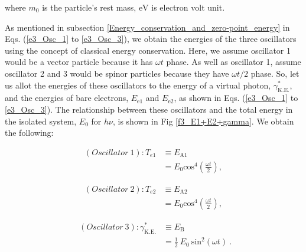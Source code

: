 \documentclass[%
 reprint,
 amsmath,amssymb,
 aps,
]{revtex4-1}
\numberwithin{equation}{section}
\begin{document}
    \noindent
    where $m_{0}$ is the particle's rest mass, $\mathrm{eV}$ is electron volt unit.

    As mentioned in subsection \ref{Energy_conservation_and_zero-point_energy} in Eqs. (\ref{e3_Osc_1} to \ref{e3_Osc_3}), we obtain the energies of the three oscillators using the concept of classical energy conservation. Here, we assume oscillator 1 would be a vector particle because it has $\omega t$ phase. As well as oscillator 1, assume oscillator 2 and 3 would be spinor particles because they have $\omega t / 2$ phase. So, let us allot the energies of these oscillators to the energy of a virtual photon, $\gamma^{*}_\mathrm{K.E.}$, and the energies of bare electrons, $E_\mathrm{e1}$ and $E_\mathrm{e2}$, as shown in Eqs. (\ref{e3_Osc_1} to \ref{e3_Osc_3}). The relationship between these oscillators and the total energy in the isolated system, $E_\mathrm{0}$ for $h \nu$, is shown in Fig \ref{f3_E1+E2+gamma}. We obtain the following:

        \begin{equation}
            \begin{split}
                (Oscillator \ 1): T_{e1}
                    & \equiv E_{\mathrm{A1}} \\
                    &= E_{0} \mathrm{cos}^{4} \left( \frac{\omega t}{2} \right)
                    ,
                \label{e3_Osc_1_PE}
            \end{split}
        \end{equation}

        \begin{equation}
            \begin{split}
                (Oscillator \ 2): T_{e2}
                    & \equiv E_{\mathrm{A2}} \\
                    &= E_{0} \mathrm{cos}^{4} \left( \frac{\omega t}{2} \right)
                    ,
                \label{e3_Osc_2_PE}
            \end{split}
        \end{equation}

        \begin{equation}
            \begin{split}
                \ \ (Oscillator \ 3):  \gamma^{*}_\mathrm{K.E.}
                    & \equiv E_{\mathrm{B}} \\
                    &= \frac{1}{2} \ E_{0} \ \mathrm{sin}^{2} (\omega t)
                    \ .
                \label{e3_Osc_3_KE}
            \end{split}
        \end{equation}
\end{document}
